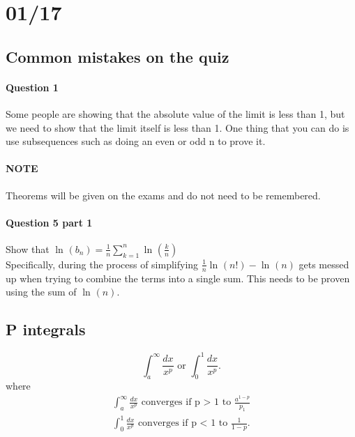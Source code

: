 \section{01/17}%
\label{sec:01/17}

\subsection{Common mistakes on the quiz}%
\label{sub:Common mistakes on the quiz}
\paragraph{Question 1}
Some people are showing that the absolute value of the limit is less than 1, but we need to show that the limit itself is less than 1. One thing that you can do is use subsequences such as doing an even or odd n to prove it.

\paragraph{NOTE}
Theorems will be given on the exams and do not need to be remembered. 

\paragraph{Question 5 part 1}
Show that $ \ln^{  } \left( b_n \right) = \frac{ 1 }{ n } \sum_{ k=1 } ^{ n } \ln^{  } \left( \frac{ k }{ n }  \right) $ \\

Specifically, during the process of simplifying $ \frac{ 1 }{ n } \ln^{  } \left( n! \right) -\ln^{  } \left( n \right) $ gets messed up when trying to combine the terms into a single sum. This needs to be proven using the sum of $ \ln^{  } \left( n \right)  $.


\subsection{P integrals}%
\label{sub:P integrals}
\[
\int_{ a }^{ \infty } \frac{ dx }{ x^{ p } } \text{ or } \int_{ 0 }^{ 1 } \frac{ dx }{ x^{ p } }
.\] 
where
\begin{align*}
\int_{ a }^{ \infty } \frac{ dx }{ x^{ p } } \text{ converges if p > 1 to } \frac{ a^{ 1-p } }{ p_1 }\\
\int_{ 0 }^{ 1 } \frac{ dx }{ x^{ p } } \text{ converges if p < 1 to } \frac{ 1 }{ 1-p }
.\end{align*}

